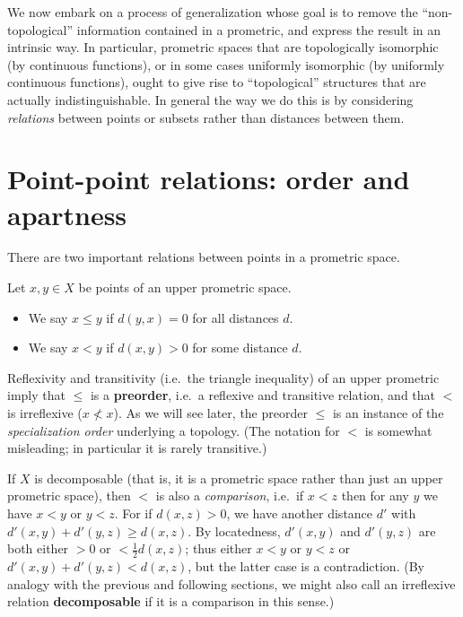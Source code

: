 \documentclass{article}
\begin{document}

We now embark on a process of generalization whose goal is to remove the ``non-topological'' information contained in a prometric, and express the result in an intrinsic way.
In particular, prometric spaces that are topologically isomorphic (by continuous functions), or in some cases uniformly isomorphic (by uniformly continuous functions), ought to give rise to ``topological'' structures that are actually indistinguishable.
In general the way we do this is by considering \emph{relations} between points or subsets rather than distances between them.


\section{Point-point relations: order and apartness}
\label{sec:point-point}
\label{sec:order}

There are two important relations between points in a prometric space.

\begin{defn}
  Let $x,y\in X$ be points of an upper prometric space.
  \begin{itemize}
  \item We say $x\le y$ if $d(y,x)=0$ for all distances $d$.
  \item We say $x<y$ if $d(x,y)>0$ for some distance $d$.
  \end{itemize}
\end{defn}

Reflexivity and transitivity (i.e.\ the triangle inequality) of an upper prometric imply that $\le$ is a \textbf{preorder}, i.e.\ a reflexive and transitive relation, and that $<$ is irreflexive ($x\not<x$).
As we will see later, the preorder $\le$ is an instance of the \emph{specialization order} underlying a topology.
(The notation for $<$ is somewhat misleading; in particular it is rarely transitive.)

If $X$ is decomposable (that is, it is a prometric space rather than just an upper prometric space), then $<$ is also a \emph{comparison}, i.e.\ if $x<z$ then for any $y$ we have $x<y$ or $y<z$.
For if $d(x,z)>0$, we have another distance $d'$ with $d'(x,y)+d'(y,z)\ge d(x,z)$.
By locatedness, $d'(x,y)$ and $d'(y,z)$ are both either $>0$ or $<\frac12 d(x,z)$; thus either $x<y$ or $y<z$ or $d'(x,y)+d'(y,z) < d(x,z)$, but the latter case is a contradiction.
(By analogy with the previous and following sections, we might also call an irreflexive relation \textbf{decomposable} if it is a comparison in this sense.)
\end{document}
